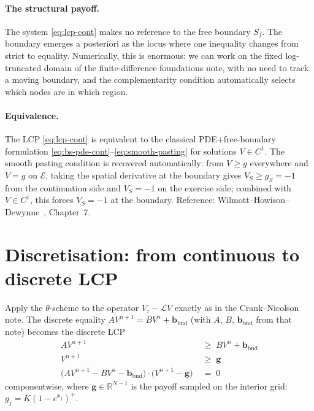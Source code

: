 \documentclass[11pt,a4paper]{article}
\begin{document}
\paragraph{The structural payoff.} The system \eqref{eq:lcp-cont}
makes no reference to the free boundary $S_f$. The boundary emerges
a posteriori as the locus where one inequality changes from strict
to equality. Numerically, this is enormous: we can work on the
fixed log-truncated domain of the finite-difference foundations note, with no need to track a
moving boundary, and the complementarity condition automatically
selects which nodes are in which region.

\paragraph{Equivalence.} The LCP \eqref{eq:lcp-cont} is equivalent
to the classical PDE+free-boundary formulation
\eqref{eq:bs-pde-cont}--\eqref{eq:smooth-pasting} for solutions
$V \in C^1$. The smooth pasting condition is recovered automatically:
from $V \geq g$ everywhere and $V = g$ on $\mathcal{E}$, taking the
spatial derivative at the boundary gives $V_S \geq g_S = -1$ from
the continuation side and $V_S = -1$ on the exercise side; combined
with $V \in C^1$, this forces $V_S = -1$ at the boundary. Reference:
Wilmott--Howison--Dewynne~\cite{WHD1995}, Chapter~7.

\section{Discretisation: from continuous to discrete LCP}

Apply the $\theta$-scheme to the operator $V_\tau - \mathcal{L}V$
exactly as in the Crank--Nicolson note. The discrete equality $A V^{n+1} = B V^n +
\mathbf{b}_{\mathrm{bnd}}$ (with $A$, $B$, $\mathbf{b}_{\mathrm{bnd}}$ from
that note) becomes the discrete LCP
\begin{equation}
\boxed{\;\;\begin{aligned}
A V^{n+1} \;&\geq\; B V^n + \mathbf{b}_{\mathrm{bnd}} \\
V^{n+1} \;&\geq\; \mathbf{g} \\
\bigl(A V^{n+1} - B V^n - \mathbf{b}_{\mathrm{bnd}}\bigr) \cdot
\bigl(V^{n+1} - \mathbf{g}\bigr) \;&=\; 0
\end{aligned}\;\;}
\label{eq:lcp-discrete}
\end{equation}
componentwise, where $\mathbf{g} \in \mathbb{R}^{N-1}$ is the payoff
sampled on the interior grid: $g_j = K(1 - e^{x_j})^+$.
\end{document}

